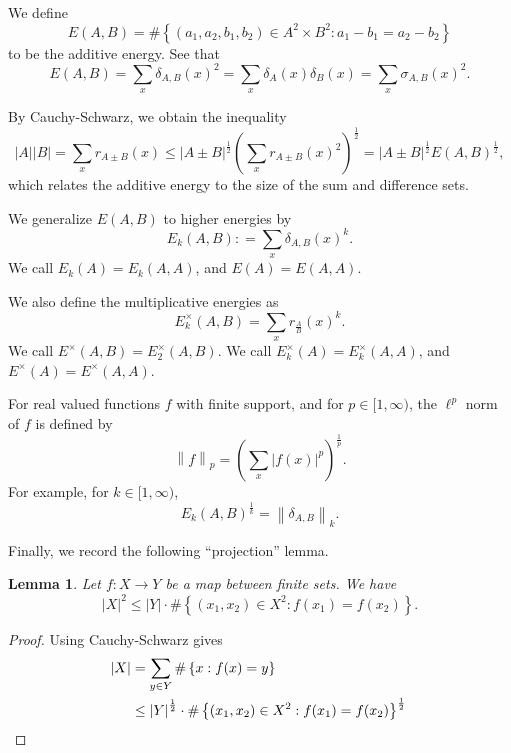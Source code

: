 \documentclass[reqno]{amsart}
\numberwithin{equation}{section}
\newtheorem{lemma}[theorem]{Lemma}
\begin{document}
We define
\[
    E(A,B) = \# \left\{ (a_1,a_2,b_1,b_2)\in A^{2}\times B^{2} : a_1-b_1 = a_2 - b_2 \right\}
\]
to be the additive energy. See that
\[
   E(A,B) = \sum _{x} \delta_{A,B} (x)^{2} = \sum _{x} \delta_{A} (x) \delta_{B} (x) = \sum _{x}  \sigma_{A,B} (x)^{2}
.\]

By Cauchy-Schwarz, we obtain the inequality
\[
    \left\lvert A \right\rvert \left\lvert B \right\rvert  = \sum _{x} r_{A \pm B} (x) \leq \left\lvert A \pm B \right\rvert ^{\frac{1}{2} } \left( \sum _{x} r_{A \pm B} (x)^{2} \right) ^{\frac{1}{2} }  = \left\lvert A \pm B \right\rvert ^{\frac{1}{2} } E(A,B) ^{\frac{1}{2} }
,\]
which relates the additive energy to the size of the sum and difference sets.

We generalize \(E(A,B)\) to higher energies by
\[
    E_{k} (A,B) : = \sum _{x}  \delta_{A,B} (x)^{k}
.\]
We call \(E_{k} (A) = E_{k} (A,A)\), and \(E(A) = E(A,A)\).

We also define the multiplicative energies as
\[
    E^{\times }_{k} (A,B) = \sum _{x} r_{\frac{A}{B} } (x)^{k}
.\]
We call \(E^{\times }(A,B)= E^{\times }_{2} (A,B)\). We call \(E_{k} ^{\times }(A) = E_{k} ^{\times }(A,A)\), and \(E^{\times }(A) = E^{\times }(A,A)\).

For real valued functions \(f\) with finite support, and for \(p \in [1,\infty )\), the \(\ell ^{p}\) norm of \(f\) is
defined by
\[
    \left\lVert f \right\rVert _{p} = \left( \sum _{x} \left\lvert f(x) \right\rvert ^{p} \right) ^{\frac{1}{p} }
.\]
For example, for \(k \in [1,\infty )\),
\[
    E_{k} (A,B)^{\frac{1}{k} } = \left\lVert \delta_{A,B}  \right\rVert _{k} 
.\]

Finally, we record the following ``projection'' lemma.
\begin{lemma}\label{lem:CS-proj}
Let \(f:X\to Y\) be a map between finite sets. We have
\[
    \left\lvert X \right\rvert ^{2} \leq \left\lvert Y \right\rvert \cdot \# \left\{ (x_1,x_2)\in X^{2} : f(x_1)= f(x_2) \right\}
.\]
\end{lemma}
\begin{proof}
Using Cauchy-Schwarz gives
\begin{align*}
    \left\lvert X \right\rvert & = \sum _{y \in Y} \# \left\{ x : f(x) = y \right\} \\
    & \leq \left\lvert Y \right\rvert^{\frac{1}{2} } \cdot \# \left\{ (x_1,x_2)\in X^{2} : f(x_1) = f(x_2) \right\}^{\frac{1}{2} } \qedhere
\end{align*}
\end{proof}
\end{document}
